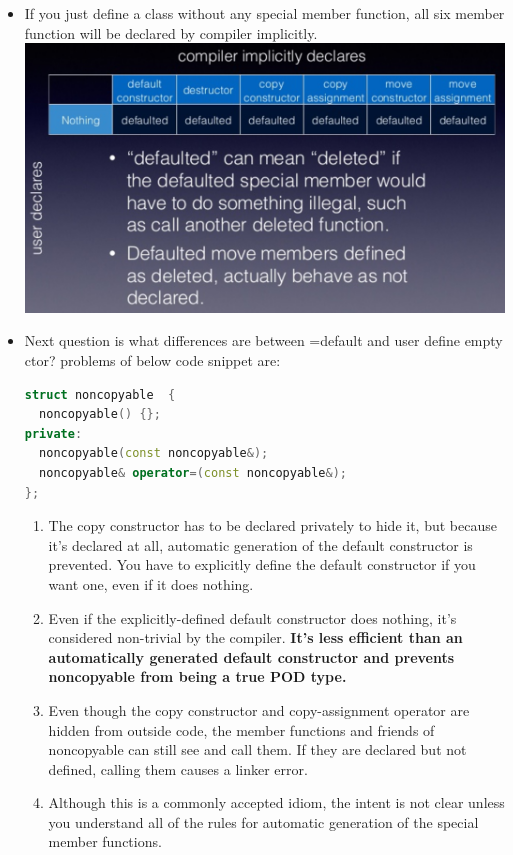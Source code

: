 \documentclass[a4paper,12pt,twoside]{book}
\begin{document}
\begin{itemize}
\item If you just define a class without any special member function, all six member function will be declared by compiler implicitly. \\
\includegraphics[scale=0.6]{pics/sm2.png} \newline


\item Next question is what differences are between =default and user define empty ctor? problems of below code snippet are:
\begin{lstlisting}[frame=single, language=c++]
struct noncopyable  {
  noncopyable() {};
private:
  noncopyable(const noncopyable&);
  noncopyable& operator=(const noncopyable&);
};
\end{lstlisting}
\begin{enumerate}
\item The copy constructor has to be declared privately to hide it, but because it's declared at all, automatic generation of the default constructor is prevented. You have to explicitly define the default constructor if you want one, even if it does nothing.
\item Even if the explicitly-defined default constructor does nothing, it's considered non-trivial by the compiler. \textbf{It's less efficient than an automatically generated default constructor and prevents noncopyable from being a true POD type.}
\item Even though the copy constructor and copy-assignment operator are hidden from outside code, the member functions and friends of noncopyable can still see and call them. If they are declared but not defined, calling them causes a linker error.
\item Although this is a commonly accepted idiom, the intent is not clear unless you understand all of the rules for automatic generation of the special member functions.
\end{enumerate}



\end{itemize}
\end{document}
